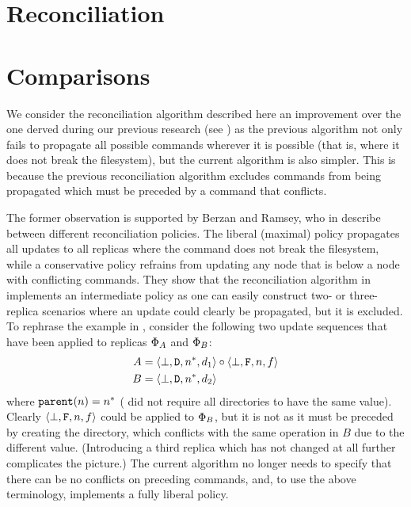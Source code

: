 \documentclass[12pt]{article}
\begin{document}
\section{Reconciliation}










\section{Comparisons}

We consider the reconciliation algorithm described here an improvement over
the one derved during our previous research (see \cite{NREC})
as the previous algorithm not only fails to propagate all possible commands
wherever it is possible (that is, where it does not break the filesystem),
but the current algorithm is also simpler.
This is because the previous reconciliation algorithm excludes
commands from being propagated which must be preceded by a command that conflicts.

The former observation is supported by Berzan and Ramsey, who in \cite{CBNR} 
describe between different reconciliation policies.
The liberal (maximal) policy propagates all updates to all replicas where
the command does not break the filesystem, while a conservative policy
refrains from updating any node that is below a node with conflicting commands.
They show that the reconciliation algorithm in \cite{NREC} implements
an intermediate policy as one can easily construct two- or three-replica scenarios
where an update could clearly be propagated, but it is excluded.
To rephrase the example in \cite{CBNR}, consider the following two
update sequences that have been applied to replicas $\Phi_A$ and $\Phi_B$:
\begin{align*}
A&=\langle{\bot,\mathtt{D},n^*,d_1}\rangle\circ\langle{\bot,\mathtt{F},n,f}\rangle \\
B&=\langle{\bot,\mathtt{D},n^*,d_2}\rangle
\end{align*}
where $\mathtt{parent}(n)=n^*$ (\cite{NREC} did not require all directories to have the same value).
Clearly $\langle{\bot,\mathtt{F},n,f}\rangle$ could be applied to $\Phi_B$, but it is not as
it must be preceded by creating the directory, which conflicts with the same operation in $B$
due to the different value.
(Introducing a third replica which has not changed at all further complicates the picture.)
The current algorithm no longer needs to specify that there can be no conflicts
on preceding commands, and, to use the above terminology, implements a fully liberal policy.
\end{document}
